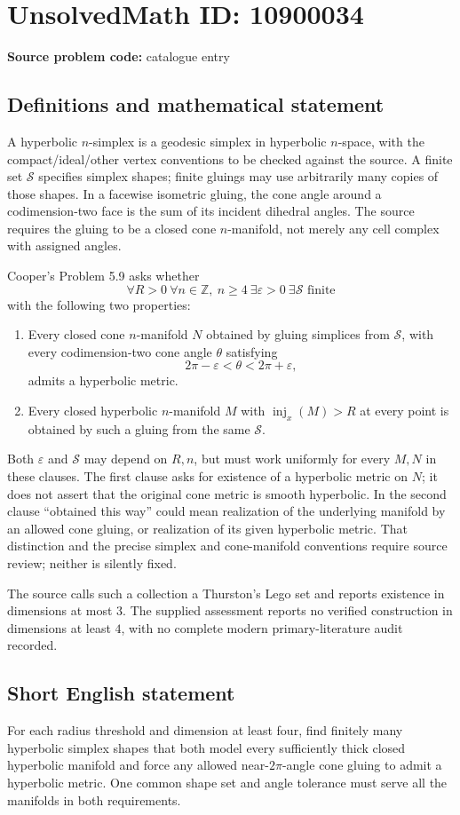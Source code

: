 \documentclass[11pt]{article}
\newcommand{\Z}{\mathbb{Z}}
\newcommand{\eps}{\varepsilon}
\begin{document}
\section*{UnsolvedMath ID: 10900034}
\textbf{Source problem code:} catalogue entry
\subsection{Definitions and mathematical statement}
A hyperbolic \(n\)-simplex is a geodesic simplex in hyperbolic \(n\)-space, with the compact/ideal/other vertex conventions to be checked against the source. A finite set \(\mathcal S\) specifies simplex shapes; finite gluings may use arbitrarily many copies of those shapes. In a facewise isometric gluing, the cone angle around a codimension-two face is the sum of its incident dihedral angles. The source requires the gluing to be a closed cone \(n\)-manifold, not merely any cell complex with assigned angles.

Cooper's Problem 5.9 asks whether
\[
 \forall R>0\ \forall n\in\Z,\ n\ge4\ \exists\eps>0\
 \exists\mathcal S\text{ finite}
\]
with the following two properties:
\begin{enumerate}
\item Every closed cone \(n\)-manifold \(N\) obtained by gluing simplices from \(\mathcal S\), with every codimension-two cone angle \(\theta\) satisfying
\[
 2\pi-\eps<\theta<2\pi+\eps,
\]
admits a hyperbolic metric.
\item Every closed hyperbolic \(n\)-manifold \(M\) with \(\operatorname{inj}_x(M)>R\) at every point is obtained by such a gluing from the same \(\mathcal S\).
\end{enumerate}
Both \(\eps\) and \(\mathcal S\) may depend on \(R,n\), but must work uniformly for every \(M,N\) in these clauses. The first clause asks for existence of a hyperbolic metric on \(N\); it does not assert that the original cone metric is smooth hyperbolic. In the second clause ``obtained this way'' could mean realization of the underlying manifold by an allowed cone gluing, or realization of its given hyperbolic metric. That distinction and the precise simplex and cone-manifold conventions require source review; neither is silently fixed.

The source calls such a collection a Thurston's Lego set and reports existence in dimensions at most \(3\). The supplied assessment reports no verified construction in dimensions at least \(4\), with no complete modern primary-literature audit recorded.
\subsection{Short English statement}
For each radius threshold and dimension at least four, find finitely many hyperbolic simplex shapes that both model every sufficiently thick closed hyperbolic manifold and force any allowed near-\(2\pi\)-angle cone gluing to admit a hyperbolic metric. One common shape set and angle tolerance must serve all the manifolds in both requirements.
\end{document}
